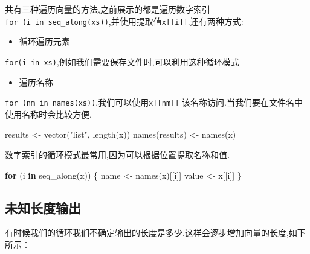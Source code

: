 \documentclass[
]{book}
\newenvironment{Shaded}{\begin{snugshade}}{\end{snugshade}}
\newcommand{\ControlFlowTok}[1]{\textcolor[rgb]{0.13,0.29,0.53}{\textbf{#1}}}
\newcommand{\FunctionTok}[1]{\textcolor[rgb]{0.00,0.00,0.00}{#1}}
\newcommand{\NormalTok}[1]{#1}
\newcommand{\OtherTok}[1]{\textcolor[rgb]{0.56,0.35,0.01}{#1}}
\newcommand{\StringTok}[1]{\textcolor[rgb]{0.31,0.60,0.02}{#1}}
\providecommand{\tightlist}{%
  \setlength{\itemsep}{0pt}\setlength{\parskip}{0pt}}
\begin{document}
共有三种遍历向量的方法,之前展示的都是遍历数字索引\texttt{for\ (i\ in\ seq\_along(xs))},并使用提取值\texttt{x{[}{[}i{]}{]}}.还有两种方式:

\begin{itemize}
\tightlist
\item
  循环遍历元素
\end{itemize}

\texttt{for(i\ in\ xs)},例如我们需要保存文件时,可以利用这种循环模式

\begin{itemize}
\tightlist
\item
  遍历名称
\end{itemize}

\texttt{for\ (nm\ in\ names(xs))},我们可以使用\texttt{x{[}{[}nm{]}{]}} 该名称访问.当我们要在文件名中使用名称时会比较方便.

\begin{Shaded}
\begin{Highlighting}[]
\NormalTok{results }\OtherTok{\textless{}{-}} \FunctionTok{vector}\NormalTok{(}\StringTok{"list"}\NormalTok{, }\FunctionTok{length}\NormalTok{(x))}
\FunctionTok{names}\NormalTok{(results) }\OtherTok{\textless{}{-}} \FunctionTok{names}\NormalTok{(x)}
\end{Highlighting}
\end{Shaded}

数字索引的循环模式最常用,因为可以根据位置提取名称和值.

\begin{Shaded}
\begin{Highlighting}[]
\ControlFlowTok{for}\NormalTok{ (i }\ControlFlowTok{in} \FunctionTok{seq\_along}\NormalTok{(x)) \{}
\NormalTok{  name }\OtherTok{\textless{}{-}} \FunctionTok{names}\NormalTok{(x)[[i]]}
\NormalTok{  value }\OtherTok{\textless{}{-}}\NormalTok{ x[[i]]}
\NormalTok{\}}
\end{Highlighting}
\end{Shaded}

\hypertarget{ux672aux77e5ux957fux5ea6ux8f93ux51fa}{%
\subsection{未知长度输出}\label{ux672aux77e5ux957fux5ea6ux8f93ux51fa}}

有时候我们的循环我们不确定输出的长度是多少.这样会逐步增加向量的长度,如下所示：
\end{document}
